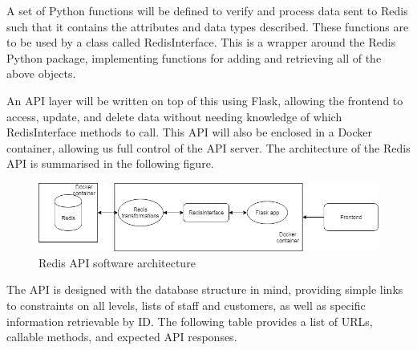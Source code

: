 A set of Python functions will be defined to verify and process data sent to Redis such that it contains the attributes and data types described. These functions are to be used by a class called RedisInterface. This is a wrapper around the Redis Python package, implementing functions for adding and retrieving all of the above objects.

An API layer will be written on top of this using Flask, allowing the frontend to access, update, and delete data without needing knowledge of which RedisInterface methods to call. This API will also be enclosed in a Docker container, allowing us full control of the API server. The architecture of the Redis API is summarised in the following figure.

\begin{figure}[h]
    \centering
    \includegraphics[scale=0.5]{redis_backend_diagram.png}
    \caption{Redis API software architecture}
    \label{fig:redis_architecturel}
\end{figure}

The API is designed with the database structure in mind, providing simple links to constraints on all levels, lists of staff and customers, as well as specific information retrievable by ID. The following table provides a list of URLs, callable methods, and expected API responses.

